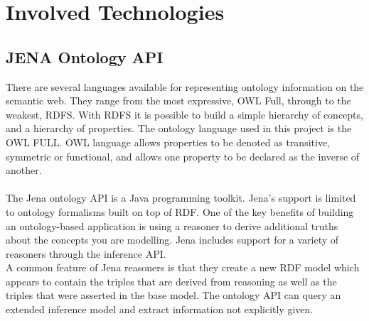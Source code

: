
\section{Involved Technologies}

\subsection{JENA Ontology API}
There are several languages available for representing ontology information on the semantic web. They range from the most expressive, OWL Full, through to the weakest, RDFS. With RDFS it is possible to build a simple hierarchy of concepts, and a hierarchy of properties. The ontology language used in this project is the OWL FULL. OWL language allows properties to be denoted as transitive, symmetric or functional, and allows one property to be declared as the inverse of another.\\
\\
The Jena ontology API is a Java programming toolkit. Jena's support is limited to ontology formalisms built on top of RDF. One of the key benefits of building an ontology-based application is using a reasoner to derive additional truths about the concepts you are modelling. Jena includes support for a variety of reasoners through the inference API.
\\
A common feature of Jena reasoners is that they create a new RDF model which appears to contain the triples that are derived from reasoning as well as the triples that were asserted in the base model. The ontology API can query an extended inference model and extract information not explicitly given.

